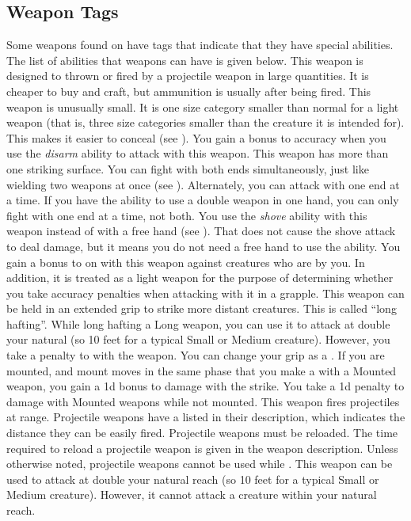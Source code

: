     \subsection{Weapon Tags}\label{Weapon Tags}
        Some weapons found on  have tags that indicate that they have special abilities. The list of abilities that weapons can have is given below.
         This weapon is designed to thrown or fired by a projectile weapon in large quantities. It is cheaper to buy and craft, but ammunition is usually  after being fired.
         This weapon is unusually small. It is one size category smaller than normal for a light weapon (that is, three size categories smaller than the creature it is intended for). This makes it easier to conceal (see ).
         You gain a  bonus to accuracy when you use the \textit{disarm} ability to attack with this weapon.
         This weapon has more than one striking surface. You can fight with both ends simultaneously, just like wielding two weapons at once (see ). Alternately, you can attack with one end at a time. If you have the ability to use a double weapon in one hand, you can only fight with one end at a time, not both.
         You use the \textit{shove} ability with this weapon instead of with a free hand (see ).
        That does not cause the shove attack to deal damage, but it means you do not need a free hand to use the ability.
         You gain a  bonus to  on  with this weapon against creatures who are  by you.
        In addition, it is treated as a light weapon for the purpose of determining whether you take accuracy penalties when attacking with it in a grapple.
         This weapon can be held in an extended grip to strike more distant creatures.
        This is called ``long hafting''.
        While long hafting a Long weapon, you can use it to attack at double your natural  (so 10 feet for a typical Small or Medium creature).
        However, you take a  penalty to  with the weapon.
        You can change your grip as a .
        \label{Mounted Weapon} If you are mounted, and mount moves in the same phase that you make a  with a Mounted weapon, you gain a \plus1d bonus to damage with the strike.
        You take a \minus1d penalty to damage with Mounted weapons while not mounted.
         This weapon fires projectiles at range. Projectile weapons have a  listed in their description, which indicates the distance they can be easily fired. Projectile weapons must be reloaded. The time required to reload a projectile weapon is given in the weapon description.
        Unless otherwise noted, projectile weapons cannot be used while \prone.
        \label{Reach Weapon} This weapon can be used to attack at double your natural reach (so 10 feet for a typical Small or Medium creature).
        However, it cannot attack a creature within your natural reach.

